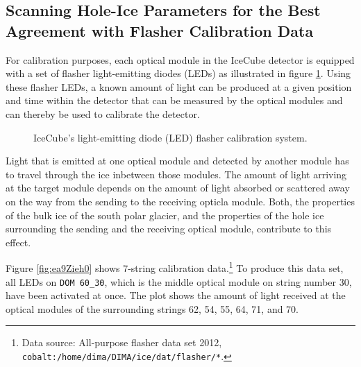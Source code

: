 
\subsection{Scanning Hole-Ice Parameters for the Best Agreement with Flasher Calibration Data}
\label{sec:flasher}

For calibration purposes, each optical module in the IceCube detector is equipped with a set of flasher light-emitting diodes (LEDs) as illustrated in figure \ref{fig:Quee3yui}. Using these flasher LEDs, a known amount of light can be produced at a given position and time within the detector that can be measured by the optical modules and can thereby be used to calibrate the detector. \cite{icepaper}

\begin{figure}[htbp]
  \hfill
  \caption{IceCube's light-emitting diode (LED) flasher calibration system.}
  \label{fig:Quee3yui}
\end{figure}

Light that is emitted at one optical module and detected by another module has to travel through the ice inbetween those modules. The amount of light arriving at the target module depends on the amount of light absorbed or scattered away on the way from the sending to the receiving opticla module. Both, the properties of the bulk ice of the south polar glacier, and the properties of the hole ice surrounding the sending and the receiving optical module, contribute to this effect.

Figure \ref{fig:ea9Zieh0} shows 7-string calibration data.\footnote{Data source: All-purpose flasher data set 2012, \texttt{cobalt:/home/dima/DIMA/ice/dat/flasher/*}.} To produce this data set, all LEDs on \texttt{DOM 60\_30}, which is the middle optical module on string number 30, have been activated at once. The plot shows the amount of light received at the optical modules of the surrounding strings 62, 54, 55, 64, 71, and 70.


